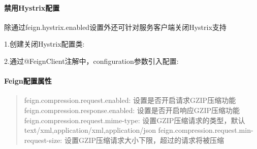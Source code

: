 \documentclass[letterpaper,10pt,english]{sphinxmanual}
\begin{document}
\paragraph{禁用Hystrix配置}
\label{\detokenize{01.spring-cloud/03.feign/feign_03:id3}}
除通过feign.hystrix.enabled设置外还可针对服务客户端关闭Hystrix支持

1.创建关闭Hystrix配置类:

\begin{sphinxVerbatim}[commandchars=\\\{\}]
  

      
         

\end{sphinxVerbatim}

2.通过@FeignClient注解中，configuration参数引入配置:

\begin{sphinxVerbatim}[commandchars=\\\{\}]
     
  

\end{sphinxVerbatim}


\paragraph{Feign配置属性}
\label{\detokenize{01.spring-cloud/03.feign/feign_03:id4}}\begin{quote}

feign.compression.request.enabled: 设置是否开启请求GZIP压缩功能
feign.compression.response.enabled: 设置是否开启响应GZIP压缩功能
feign.compression.request.mime-type: 设置GZIP压缩请求的类型，默认text/xml,application/xml,application/json
feign.compression.request.min-request-size: 设置GZIP压缩请求大小下限，超过的请求将被压缩
\end{quote}
\end{document}
